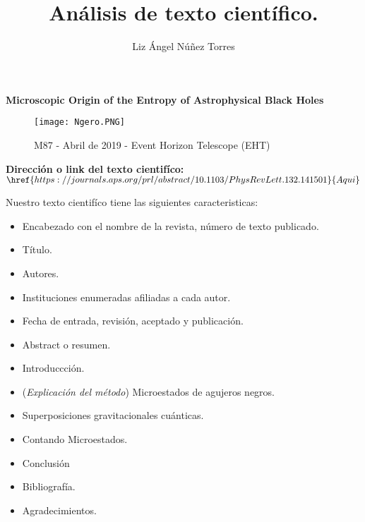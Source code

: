 \documentclass[letterpaper]{article}
\title{Análisis de texto científico. }
\author{Liz Ángel Núñez Torres}
\begin{document}
\begin{titlepage}
    \maketitle
\end{titlepage}

\begin{center}
    
    \textbf{\huge Microscopic Origin of the Entropy of Astrophysical Black Holes}

\end{center}

\vspace{\baselineskip}

\vspace{\baselineskip}

\vspace{\baselineskip}

\begin{figure}[h]
    \centering
    \texttt{[image: Ngero.PNG]}
    \caption{  M87 - Abril de 2019 -  Event Horizon Telescope (EHT) }
    
\end{figure}

\textbf{Dirección o link del texto cientifíco:} \( \href{https://journals.aps.org/prl/abstract/10.1103/PhysRevLett.132.141501}{Aqui}\)

\newpage

\begin{justify}

Nuestro texto cientifíco tiene las siguientes caracteristicas:

\begin{itemize}    
    \item Encabezado con el nombre de la revista, número de texto publicado.
    \item Título.
    \item Autores.
    \item Instituciones enumeradas afiliadas a cada autor.
    \item Fecha de entrada, revisión, aceptado y publicación.
    \item Abstract o resumen.
    \item Introduccción.
    \item (\textit{Explicación del método}) Microestados de agujeros negros.
    \item Superposiciones gravitacionales cuánticas.
    \item Contando Microestados.
    \item Conclusión
    \item Bibliografía.
    \item Agradecimientos.
\end{itemize}
\end{justify}
\end{document}
